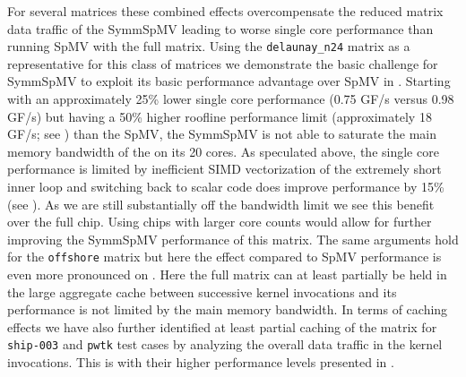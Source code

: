  For several matrices these combined effects overcompensate the reduced matrix data traffic of the \acrshort{SymmSpMV}\rAdd{,} leading to worse single core performance than running \acrshort{SpMV} with the full matrix. Using the \texttt{delaunay\_n24} matrix as a representative for this class of matrices we demonstrate the basic challenge for \acrshort{SymmSpMV} to exploit its basic performance advantage over \acrshort{SpMV} in .
Starting with an approximately 25\% lower single core performance (0.75 GF/s versus 0.98 GF/s) but having a 50\% higher roofline performance limit (approximately 18 GF/s; see ) than the \acrshort{SpMV}, the \acrshort{SymmSpMV} is not able to saturate the main memory bandwidth of the \SKX on its 20 cores. As speculated above, the single core performance is limited by inefficient SIMD vectorization of the extremely short inner loop and switching back to scalar code does improve performance by 15\% (see ). As we are still substantially off the bandwidth limit we see this benefit over the full chip. Using chips with larger core counts would allow for further improving the \acrshort{SymmSpMV} performance of this matrix. The same arguments hold for the \texttt{offshore} matrix but here the effect compared to \acrshort{SpMV} performance is even more pronounced on \SKX.  Here the full matrix can at least partially be held in the large aggregate cache between successive kernel invocations and its performance is not limited by the main memory bandwidth. In terms of caching effects we have also further identified at least partial caching of the matrix for \texttt{ship-003} and \texttt{pwtk} test cases by analyzing the overall data traffic in the kernel invocations. This is   with their higher performance levels presented in . 
%
